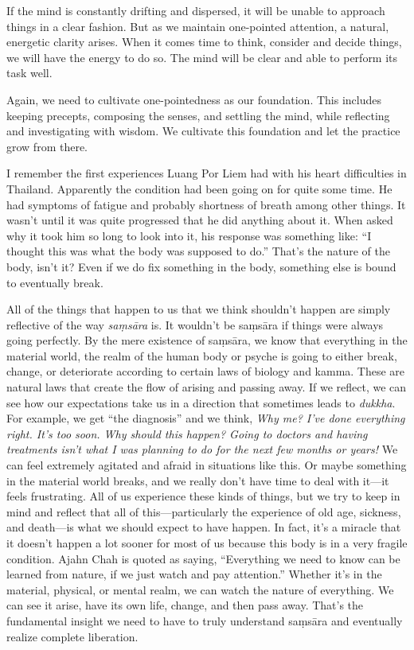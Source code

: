 If the mind is constantly drifting and dispersed, it will be unable to 
approach things in a clear fashion. But as we maintain one-pointed 
attention, a natural, energetic clarity arises. When it comes time to 
think, consider and decide things, we will have the energy to do so. 
The mind will be clear and able to perform its task well.

Again, we need to cultivate one-pointedness as our foundation. This 
includes keeping precepts, composing the senses, and settling the mind, 
while reflecting and investigating with wisdom. We cultivate this 
foundation and let the practice grow from there.


I remember the first experiences Luang Por Liem had with his heart 
difficulties in Thailand. Apparently the condition had been going on 
for quite some time. He had symptoms of fatigue and probably shortness 
of breath among other things. It wasn't until it was quite progressed 
that he did anything about it. When asked why it took him so long to 
look into it, his response was something like: ``I thought this was 
what the body was supposed to do.'' That's the nature of the body, 
isn't it? Even if we do fix something in the body, something else is 
bound to eventually break.

All of the things that happen to us that we think shouldn't happen are 
simply reflective of the way \emph{saṃsāra} is. It wouldn't be 
saṃsāra if things were always going perfectly. By the mere existence 
of saṃsāra, we know that everything in the material world, the realm 
of the human body or psyche is going to either break, change, or 
deteriorate according to certain laws of biology and kamma. These are 
natural laws that create the flow of arising and passing away. If we 
reflect, we can see how our expectations take us in a direction that 
sometimes leads to \emph{dukkha}. For example, we get ``the diagnosis'' 
and we think, \emph{Why me? I've done everything right. It's too soon. 
Why should this happen? Going to doctors and having treatments isn't 
what I was planning to do for the next few months or years!} We can 
feel extremely agitated and afraid in situations like this. Or maybe 
something in the material world breaks, and we really don't have time 
to deal with it---it feels frustrating. All of us experience these 
kinds of things, but we try to keep in mind and reflect that all of 
this---particularly the experience of old age, sickness, and death---is 
what we should expect to have happen. In fact, it's a miracle that it 
doesn't happen a lot sooner for most of us because this body is in a 
very fragile condition. Ajahn Chah is quoted as saying, ``Everything we 
need to know can be learned from nature, if we just watch and pay 
attention.'' Whether it's in the material, physical, or mental realm, 
we can watch the nature of everything. We can see it arise, have its 
own life, change, and then pass away. That's the fundamental insight we 
need to have to truly understand saṃsāra and eventually realize 
complete liberation.

